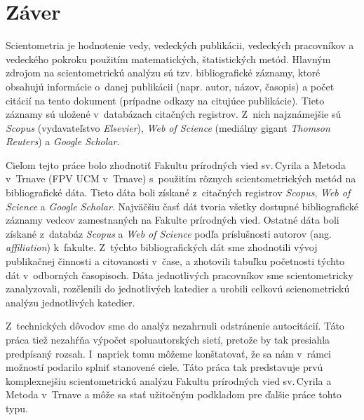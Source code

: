 ﻿\chapter*{Záver}

Scientometria je hodnotenie vedy, vedeckých publikácii, vedeckých pracovníkov a
vedeckého pokroku použitím matematických, štatistických metód. Hlavným zdrojom
na scientometrickú analýzu sú tzv. bibliografické záznamy, ktoré obsahujú
informácie o~danej publikácii (napr. autor, názov, časopis) a počet citácií na
tento dokument (prípadne odkazy na citujúce publikácie). Tieto záznamy sú
uložené v~databázach citačných registrov. Z~nich najznámejšie sú \emph{Scopus}
(vydavateľstvo \emph{Elsevier}), \emph{Web of Science} (mediálny gigant
\emph{Thomson Reuters}) a \emph{Google Scholar}.

Cieľom tejto práce bolo zhodnotiť Fakultu prírodných vied sv.\,Cyrila a Metoda
v~Trnave (FPV UCM v~Trnave) s~použitím rôznych scientometrických metód na
bibliografické dáta.  Tieto dáta boli získané z~citačných registrov
\emph{Scopus}, \emph{Web of Science} a \emph{Google Scholar}. Najväčšiu časť dát
tvoria všetky dostupné bibliografické záznamy vedcov zamestnaných na Fakulte
prírodných vied.  Ostatné dáta boli získané z~databáz \emph{Scopus} a \emph{Web
  of Science} podľa príslušnosti autorov (ang.  \emph{affiliation})
k~fakulte. Z~týchto bibliografických dát sme zhodnotili vývoj publikačnej
činnosti a citovanosti v~čase, a zhotovili tabuľku početnosti týchto dát
v~odborných časopisoch. Dáta jednotlivých pracovníkov sme scientometricky
zanalyzovali, rozčlenili do jednotlivých katedier a urobili celkovú
scienometrickú analýzu jednotlivých katedier.

Z~technických dôvodov sme do analýz nezahrnuli odstránenie autocitácií. Táto
práca tiež nezahŕňa výpočet spoluautorských sietí, pretože by tak presiahla
predpísaný rozsah.  I~napriek tomu môžeme konštatovať, že sa nám v~rámci
možností podarilo splniť stanovené ciele. Táto práca tak predstavuje prvú
komplexnejšiu scientometrickú analýzu Fakultu prírodných vied sv.\,Cyrila a
Metoda v~Trnave a môže sa stať užitočným podkladom pre ďalšie práce tohto typu.

